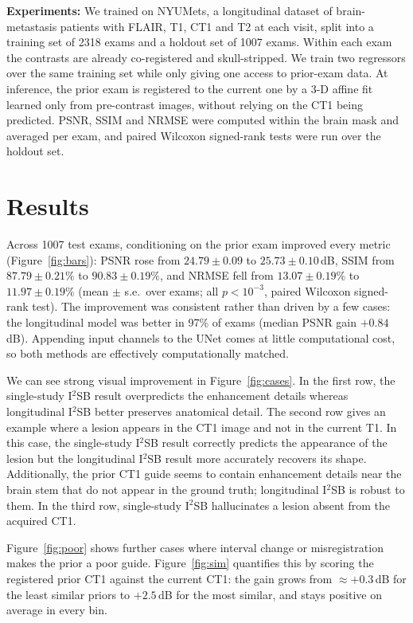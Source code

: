 \textbf{Experiments:} We trained on NYUMets, a longitudinal dataset of brain-metastasis patients
with FLAIR, T1, CT1 and T2 at each visit, split into a training set of 2318 exams and a holdout
set of 1007 exams. Within each exam the contrasts are already co-registered and skull-stripped.
We train two regressors over the same training set while only giving one access to prior-exam
data. At inference, the prior exam is registered to the current one by a 3-D affine fit learned
only from pre-contrast images, without relying on the CT1 being predicted. PSNR, SSIM and NRMSE
were computed within the brain mask and averaged per exam, and paired Wilcoxon signed-rank tests
were run over the holdout set.

\section*{Results}
Across 1007 test exams, conditioning on the prior exam improved every metric
(Figure~\ref{fig:bars}): PSNR rose from $24.79 \pm 0.09$ to $25.73 \pm 0.10$\,dB,
SSIM from $87.79 \pm 0.21\%$ to $90.83 \pm 0.19\%$, and NRMSE fell from
$13.07 \pm 0.19\%$ to $11.97 \pm 0.19\%$ (mean $\pm$ s.e.\ over exams; all
$p < 10^{-3}$, paired Wilcoxon signed-rank test). The improvement was consistent
rather than driven by a few cases: the longitudinal model was better in 97\% of exams
(median PSNR gain $+0.84$\,dB). Appending input channels to the UNet comes at little
computational cost, so both methods are effectively computationally matched.

We can see strong visual improvement in Figure~\ref{fig:cases}. In the first row, the
single-study I$^2$SB result overpredicts the enhancement details whereas longitudinal I$^2$SB
better preserves anatomical detail. The second row gives an example where a lesion appears in
the CT1 image and not in the current T1. In this case, the single-study I$^2$SB result correctly
predicts the appearance of the lesion but the longitudinal I$^2$SB result more accurately
recovers its shape. Additionally, the prior CT1 guide seems to contain enhancement details near
the brain stem that do not appear in the ground truth; longitudinal I$^2$SB is robust to them.
In the third row, single-study I$^2$SB hallucinates a lesion absent from the acquired CT1.

Figure~\ref{fig:poor} shows further cases where interval change or misregistration makes the
prior a poor guide. Figure~\ref{fig:sim} quantifies this by scoring the registered prior CT1
against the current CT1: the gain grows from $\approx+0.3$\,dB for the least similar priors to
$+2.5$\,dB for the most similar, and stays positive on average in every bin.

